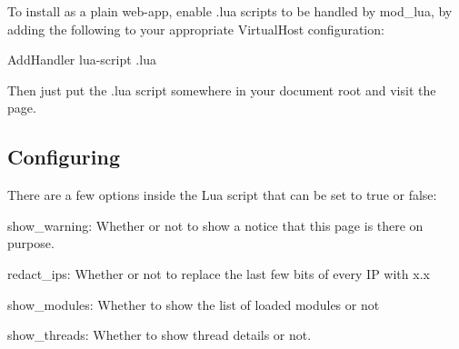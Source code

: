 To install as a plain web-\/app, enable .lua scripts to be handled by mod\+\_\+lua, by adding the following to your appropriate Virtual\+Host configuration\+: \begin{DoxyVerb}AddHandler lua-script .lua
\end{DoxyVerb}


Then just put the {\ttfamily .lua} script somewhere in your document root and visit the page.

\subsection*{Configuring}

There are a few options inside the Lua script that can be set to {\ttfamily true} or {\ttfamily false}\+:


\begin{DoxyItemize}
\item {\ttfamily show\+\_\+warning}\+: Whether or not to show a notice that this page is there on purpose.
\item {\ttfamily redact\+\_\+ips}\+: Whether or not to replace the last few bits of every IP with \textquotesingle{}x.\+x\textquotesingle{}
\item {\ttfamily show\+\_\+modules}\+: Whether to show the list of loaded modules or not
\item {\ttfamily show\+\_\+threads}\+: Whether to show thread details or not. 
\end{DoxyItemize}